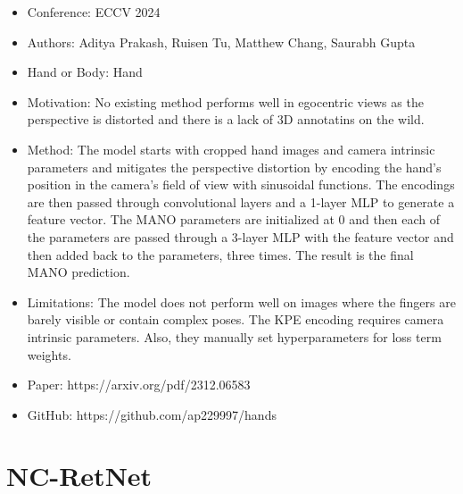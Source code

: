 \documentclass{article}
\begin{document}
\begin{itemize}
    \item Conference: ECCV 2024
    \item Authors: Aditya Prakash, Ruisen Tu, Matthew Chang, Saurabh Gupta
    \item Hand or Body: Hand
    \item Motivation: No existing method performs well in egocentric views as the perspective is distorted and there is a lack of 3D annotatins on the wild.
    \item Method: The model starts with cropped hand images and camera intrinsic parameters and mitigates the perspective distortion by encoding the hand's position in the camera's field of view with sinusoidal functions. The encodings are then passed through convolutional layers and a 1-layer MLP to generate a feature vector. The MANO parameters are initialized at 0 and then each of the parameters are passed through a 3-layer MLP with the feature vector and then added back to the parameters, three times. The result is the final MANO prediction.
    \item Limitations: The model does not perform well on images where the fingers are barely visible or contain complex poses. The KPE encoding requires camera intrinsic parameters. Also, they manually set hyperparameters for loss term weights.
    \item Paper: https://arxiv.org/pdf/2312.06583
    \item GitHub: https://github.com/ap229997/hands
\end{itemize}

\section*{NC-RetNet}
\end{document}
